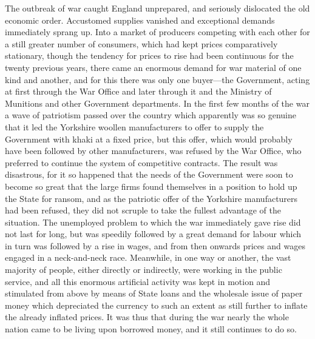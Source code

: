 \documentclass{book}
\begin{document}
The outbreak of war caught England unprepared, and seriously dislocated the old economic order. Accustomed supplies vanished and exceptional demands immediately sprang up. Into a market of producers competing with each other for a still greater number of consumers, which had kept prices comparatively stationary, though the tendency for prices to rise had been continuous for the twenty previous years, there came an enormous demand for war material of one kind and another, and for this there was only one buyer—the Government, acting at first through the War Office and later through it and the Ministry of Munitions and other Government departments. In the first few months of the war a wave of patriotism passed over the country which apparently was so genuine that it led the Yorkshire woollen manufacturers to offer to supply the Government with khaki at a fixed price, but this offer, which would probably have been followed by other manufacturers, was refused by the War Office, who preferred to continue the system of competitive contracts. The result was disastrous, for it so happened that the needs of the Government were soon to become so great that the large firms found themselves in a position to hold up the State for ransom, and as the patriotic offer of the Yorkshire manufacturers had been refused, they did not scruple to take the fullest advantage of the situation. The unemployed problem to which the war immediately gave rise did not last for long, but was speedily followed by a great demand for labour which in turn was followed by a rise in wages, and from then onwards prices and wages engaged in a neck-and-neck race. Meanwhile, in one way or another, the vast majority of people, either directly or indirectly, were working in the public service, and all this enormous artificial activity was kept in motion and stimulated from above by means of State loans and the wholesale issue of paper money which depreciated the currency to such an extent as still further to inflate the already inflated prices. It was thus that during the war nearly the whole nation came to be living upon borrowed money, and it still continues to do so.
\end{document}
